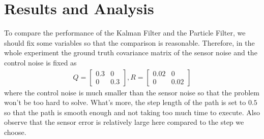 \documentclass[letterpaper,11pt]{article}
\begin{document}
\section{Results and Analysis}
To compare the performance of the Kalman Filter and the Particle Filter, we should fix some variables so that the comparison is reasonable. Therefore, in the whole experiment the ground truth covariance matrix of the sensor noise and the control noise is fixed as
\begin{align*}
	Q = \begin{bmatrix}
		0.3 & 0 \\ 0 & 0.3
	\end{bmatrix},
	R = \begin{bmatrix}
		0.02 & 0 \\ 0 & 0.02
	\end{bmatrix}
\end{align*}
where the control noise is much smaller than the sensor noise so that the problem won't be too hard to solve. What's more, the step length of the path is set to $0.5$ so that the path is smooth enough and not taking too much time to execute. Also observe that the sensor error is relatively large here compared to the step we choose.
\end{document}

